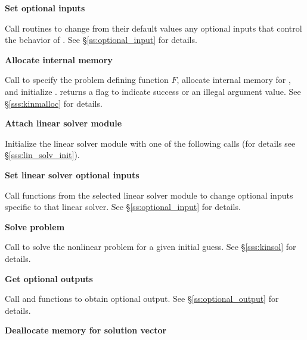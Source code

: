 \begin{Steps}
\item
  {\bf Set optional inputs}

  Call  routines to change from their default values any
  optional inputs that control the behavior of {\kinsol}.
  See \S\ref{ss:optional_input} for details.

\item\label{i:kinsol_malloc} 
  {\bf Allocate internal memory}

  Call  
  to specify the problem defining function $F$,
  allocate internal memory for {\kinsol}, 
  and initialize {\kinsol}.
   returns a flag to indicate success or an illegal argument value.
  See \S\ref{sss:kinmalloc} for details.

\item\label{i:lin_solver} 
  {\bf Attach linear solver module}

  Initialize the linear solver module with one of the following calls
  (for details see \S\ref{sss:lin_solv_init}).

  {\s} 

  {\s} 

  {\s} 

  {\s} 

  
  
  
\item
  {\bf Set linear solver optional inputs}

  Call  functions from the selected linear solver module to
  change optional inputs specific to that linear solver.
  See \S\ref{ss:optional_input} for details.

\item
  {\bf Solve problem}

  Call  to solve the nonlinear problem for a given
  initial guess. See \S\ref{sss:kinsol} for details.

\item
  {\bf Get optional outputs}

  Call  and  functions to obtain optional output.
  See \S\ref{ss:optional_output} for details.

\item
  {\bf Deallocate memory for solution vector}


\end{Steps}
